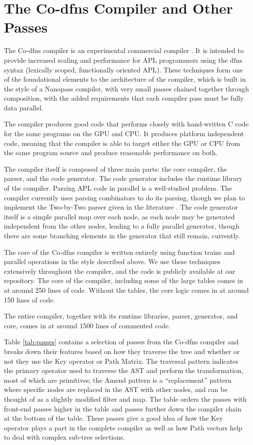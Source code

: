 ﻿\documentclass[numbers,10pt,preprint]{sigplanconf}
\begin{document}
\section{The Co-dfns Compiler and Other Passes}

The Co-dfns compiler is an experimental commercial compiler \cite{hsu2014co,hsu2015accelerating}. It is intended to provide increased scaling and performance for APL programmers using the dfns syntax (lexically scoped, functionally oriented APL). These techniques form one of the foundational elements to the architecture of the compiler, which is built in the style of a Nanopass \cite{keep2013nanopass} compiler, with very small passes chained together through composition, with the added requirements that each compiler pass must be fully data parallel.

The compiler produces good code that performs closely with hand-written C code for the same programs on the GPU and CPU. It produces platform independent code, meaning that the compiler is able to target either the GPU or CPU from the same program source and produce reasonable performance on both.

The compiler itself is composed of three main parts: the core compiler, the parser, and the code generator. The code generator includes the runtime library of the compiler. Parsing APL code in parallel is a well-studied problem. The compiler currently uses parsing combinators to do its parsing, though we plan to implement the Two-by-Two parser given in the literature \cite{bunda1984apl}. The code generator itself is a simple parallel map over each node, as each node may be generated independent from the other nodes, leading to a fully parallel generator, though there are some branching elements in the generator that still remain, currently.

The core of the Co-dfns compiler is written entirely using function trains and parallel operations in the style described above. We use these techniques extensively throughout the compiler, and the code is publicly available at our repository. The core of the compiler, including some of the large tables comes in at around 250 lines of code. Without the tables, the core logic comes in at around 150 lines of code.

The entire compiler, together with its runtime libraries, parser, generator, and core, comes in at around 1500 lines of commented code.

Table \ref{tab:passes} contains a selection of passes from the Co-dfns compiler and breaks down their features based on how they traverse the tree and whether or not they use the Key operator or Path Matrix. The traversal pattern indicates the primary operator used to traverse the AST and perform the transformation, most of which are primitives; the Amend pattern is a ``replacement'' pattern where specific nodes are replaced in the AST with other nodes, and can be thought of as a slightly modified filter and map. The table orders the passes with front-end passes higher in the table and passes further down the compiler chain at the bottom of the table. These passes give a good idea of how the Key operator plays a part in the complete compiler as well as how Path vectors help to deal with complex sub-tree selections.
\end{document}
